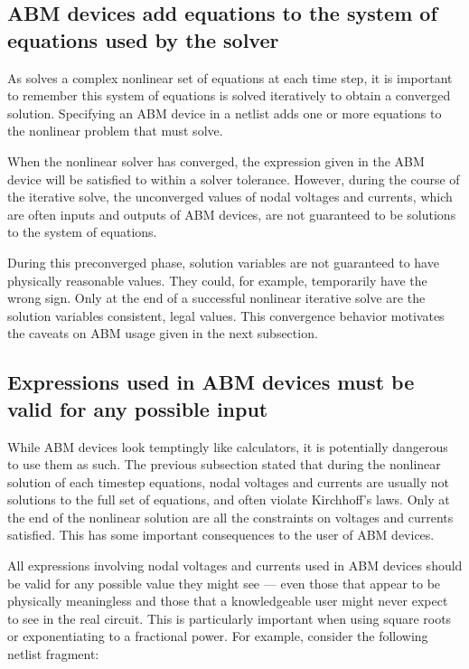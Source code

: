 \subsection{ABM devices add equations to the system of equations used by the solver}

As \Xyce{} solves a complex nonlinear set of equations at each time
step, it is important to remember this system of equations is solved
iteratively to obtain a converged solution. Specifying an ABM device
in a \Xyce{} netlist adds one or more equations to the nonlinear
problem that \Xyce{} must solve.

When the nonlinear solver has converged, the expression given in the
ABM device will be satisfied to within a solver tolerance. However,
during the course of the iterative solve, the unconverged values of
nodal voltages and currents, which are often inputs and outputs of ABM
devices, are not guaranteed to be solutions to the system of
equations.

During this preconverged phase, solution variables are not guaranteed
to have physically reasonable values. They could, for example,
temporarily have the wrong sign. Only at the end of a successful
nonlinear iterative solve are the solution variables consistent, legal
values. This convergence behavior motivates the caveats on ABM usage given 
in the next subsection.   

\subsection{Expressions used in ABM devices must be valid for any possible input}

While ABM devices look temptingly like calculators, it is potentially
dangerous to use them as such. The previous subsection stated that
during the nonlinear solution of each timestep equations, nodal
voltages and currents are usually not solutions to the full set of
equations, and often violate Kirchhoff's laws. Only at the end of the
nonlinear solution are all the constraints on voltages and currents
satisfied. This has some important consequences to the user of ABM
devices.

All expressions involving nodal voltages and currents used in ABM
devices should be valid for any possible value they might see --- even
those that appear to be physically meaningless and those that a
knowledgeable user might never expect to see in the real circuit. This
is particularly important when using square roots or exponentiating to
a fractional power. For example, consider the following netlist
fragment:


